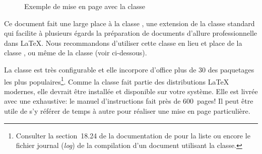 \begin{figure}
\begin{minipage}{0.48\linewidth}
  \end{minipage}
  \caption{Exemple de mise en page avec la classe }
  \label{fig:organisation:classes:book}
\end{figure}

Ce document fait une large place à la classe , une
extension de la classe standard  qui facilite à plusieurs
égards la préparation de documents d'allure professionnelle dans
{\LaTeX}. Nous recommandons d'utiliser cette classe en lieu et place
de la classe , ou même de la classe  (voir
ci-dessous).

La classe  est très configurable et elle incorpore
d'office plus de 30 des paquetages les plus populaires\footnote{%
  Consulter la section~18.24 de la documentation de 
  pour la liste ou encore le fichier journal (\emph{log}) de la
  compilation d'un document utilisant la classe.}. %
Comme la classe fait partie des distributions {\LaTeX} modernes, elle
devrait être installée et disponible sur votre système. Elle est
livrée avec une %
exhaustive: le manuel d'instructions fait près de 600~pages! Il peut
être utile de s'y référer de temps à autre pour réaliser une mise en
page particulière.

